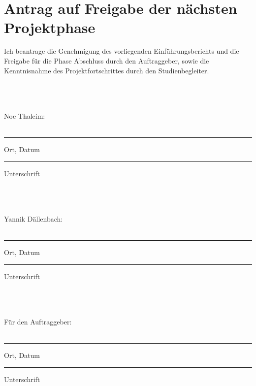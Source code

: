 \section{Antrag auf Freigabe der nächsten Projektphase}
Ich beantrage die Genehmigung des vorliegenden Einführungsberichts und die Freigabe für die Phase Abschluss durch den Auftraggeber, sowie die Kenntnisnahme des Projektfortschrittes durch den Studienbegleiter.

\\ \\ \\
Noe Thaleim:
\\ \\
\parbox{4cm}{\hrule
\strut \centering\footnotesize Ort, Datum} \hfill\parbox{4cm}{\hrule
\strut \centering\footnotesize Unterschrift}
\\ \\ \\
Yannik Dällenbach:
\\ \\
\parbox{4cm}{\hrule
\strut \centering\footnotesize Ort, Datum} \hfill\parbox{4cm}{\hrule
\strut \centering\footnotesize Unterschrift}
\\ \\ \\
Für den Auftraggeber:
\\ \\
\parbox{4cm}{\hrule
\strut \centering\footnotesize Ort, Datum} \hfill\parbox{4cm}{\hrule
\strut \centering\footnotesize Unterschrift}
